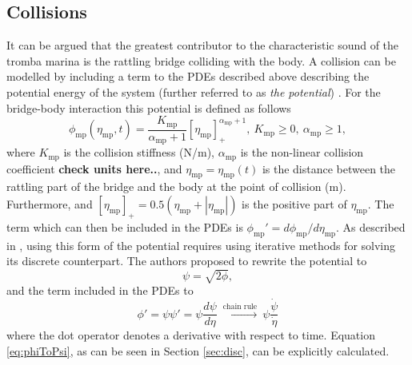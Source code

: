 \documentclass[dvipsnames, pdftex]{article}
\begin{document}
\subsection{Collisions}
It can be argued that the greatest contributor to the characteristic sound of the tromba marina is the rattling bridge colliding with the body. A collision can be modelled by including a term to the PDEs described above describing the potential energy of the system (further referred to as \textit{the potential}) \cite{Ducceschi2019}. For the bridge-body interaction this potential is defined as follows
\begin{equation}\label{eq:potential}
    \phi_\text{mp}(\eta_\text{mp}, t) = \frac{K_\text{mp}}{\alpha_\text{mp}+1}[\eta_\text{mp}]_+^{\alpha_\text{mp}+1}, \ K_\text{mp} \geq 0,\ \alpha_\text{mp} \geq 1,
\end{equation}
where $K_\text{mp}$ is the collision stiffness (N/m), $\alpha_\text{mp}$ is the non-linear collision coefficient \textbf{check units here..}, and $\eta_\text{mp} = \eta_\text{mp}(t)$ is the distance between the rattling part of the bridge and the body at the point of collision (m). Furthermore, and $[\eta_\text{mp}]_+ = 0.5(\eta_\text{mp}+|\eta_\text{mp}|)$ is the positive part of $\eta_\text{mp}$. The term which can then be included in the PDEs is $\phi_\text{mp}' = d\phi_\text{mp}/d\eta_\text{mp}$. As described in \cite{Falaize2016a:SMC2020, Falaize2016b:SMC2020, Lopes:SMC2020, Ducceschi2019}, using this form of the potential requires using iterative methods for solving its discrete counterpart. The authors proposed to rewrite the potential to
\begin{equation}
    \psi = \sqrt{2\phi},
\end{equation}
and the term included in the PDEs to
\begin{equation}\label{eq:phiToPsi}
    \phi' = \psi\psi' = \psi\frac{d\psi}{d\eta}\  \xrightarrow{\text{chain rule}}\ \psi\frac{\dot \psi}{\dot \eta}
\end{equation}
where the dot operator denotes a derivative with respect to time. Equation \eqref{eq:phiToPsi}, as can be seen in Section \ref{sec:disc}, can be explicitly calculated. 
\end{document}
